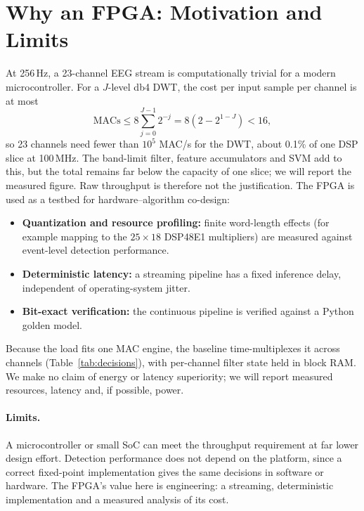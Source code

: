 \documentclass[10pt,twocolumn,letterpaper]{article}
\begin{document}
\section{Why an FPGA: Motivation and Limits}
\label{sec:fpga}

At 256\,Hz, a 23-channel EEG stream is computationally trivial for a
modern microcontroller. For a $J$-level db4 DWT, the cost per input
sample per channel is at most
\begin{equation}
  \mathrm{MACs} \le 8\sum_{j=0}^{J-1} 2^{-j} = 8\left(2-2^{1-J}\right) < 16,
  \label{eq:macs}
\end{equation}
so 23 channels need fewer than $10^{5}$ MAC/s for the DWT, about 0.1\%
of one DSP slice at 100\,MHz. The band-limit filter, feature
accumulators and SVM add to this, but the total remains far below the
capacity of one slice; we will report the measured figure. Raw
throughput is therefore not the justification. The FPGA is used as a
testbed for hardware--algorithm co-design:
\begin{itemize}
  \item \textbf{Quantization and resource profiling:} finite word-length
    effects (for example mapping to the $25\times18$ DSP48E1
    multipliers) are measured against event-level detection performance.
  \item \textbf{Deterministic latency:} a streaming pipeline has a fixed
    inference delay, independent of operating-system jitter.
  \item \textbf{Bit-exact verification:} the continuous pipeline is
    verified against a Python golden model.
\end{itemize}
Because the load fits one MAC engine, the baseline time-multiplexes it
across channels (Table~\ref{tab:decisions}), with per-channel filter
state held in block RAM. We make no claim of energy or latency
superiority; we will report measured resources, latency and, if
possible, power.

\paragraph{Limits.} A microcontroller or small SoC can meet the
throughput requirement at far lower design effort. Detection performance
does not depend on the platform, since a correct fixed-point
implementation gives the same decisions in software or hardware. The
FPGA's value here is engineering: a streaming, deterministic
implementation and a measured analysis of its cost.
\end{document}
